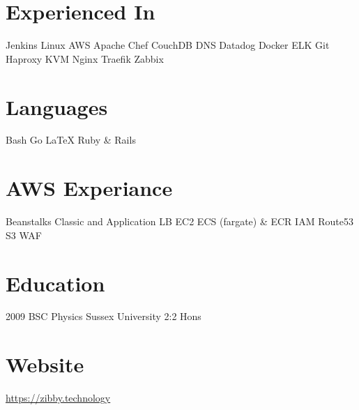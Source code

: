 \documentclass[]{friggeri-cv-a4}
\begin{document}
\fancyfoot{}

\begin{aside}
	\section{Experienced In}
		Jenkins
		Linux
    AWS
    Apache
    Chef
    CouchDB
    DNS
    Datadog
    Docker
    ELK
    Git
    Haproxy
    KVM
    Nginx
    Traefik
    Zabbix
  \section{Languages}
    Bash
    Go
    \LaTeX
    Ruby \& Rails
  \section{AWS Experiance}
    Beanstalks
    Classic and Application LB
    EC2
    ECS (fargate) \& ECR
    IAM
    Route53
    S3
    WAF
  \section{Education}
    2009 BSC Physics Sussex University 2:2 Hons
  \section{Website}
    \href{https://zibby.technology}{https://zibby.technology}
\end{aside}
\end{document}
